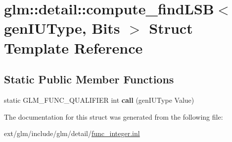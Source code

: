 \hypertarget{structglm_1_1detail_1_1compute__find_l_s_b}{\section{glm\-:\-:detail\-:\-:compute\-\_\-find\-L\-S\-B$<$ gen\-I\-U\-Type, Bits $>$ Struct Template Reference}
\label{structglm_1_1detail_1_1compute__find_l_s_b}
}
\subsection*{Static Public Member Functions}
\begin{DoxyCompactItemize}
\item 
\hypertarget{structglm_1_1detail_1_1compute__find_l_s_b_a1c0ec72e2bcf35a3109e85cfc536400b}{static G\-L\-M\-\_\-\-F\-U\-N\-C\-\_\-\-Q\-U\-A\-L\-I\-F\-I\-E\-R int {\bfseries call} (gen\-I\-U\-Type Value)}\label{structglm_1_1detail_1_1compute__find_l_s_b_a1c0ec72e2bcf35a3109e85cfc536400b}

\end{DoxyCompactItemize}


The documentation for this struct was generated from the following file\-:\begin{DoxyCompactItemize}
\item 
ext/glm/include/glm/detail/\hyperlink{func__integer_8inl}{func\-\_\-integer.\-inl}\end{DoxyCompactItemize}
